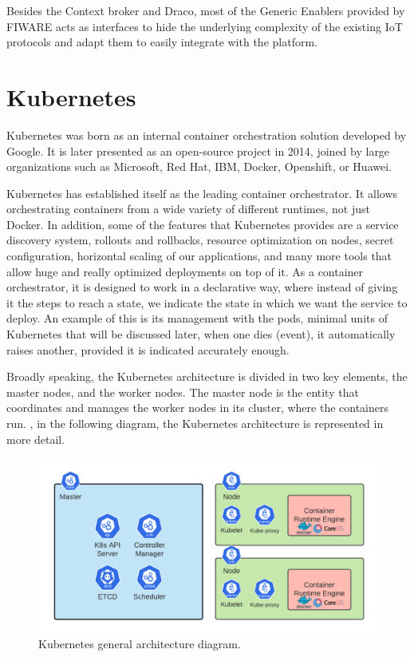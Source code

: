 Besides the Context broker and Draco, most of the Generic Enablers provided by FIWARE acts as interfaces to hide the underlying complexity of the existing IoT protocols and adapt them to easily integrate with the platform.

\clearpage

\section{Kubernetes}
\label{section:Kubernetes}

Kubernetes \cite{kubernetes} was born as an internal container orchestration solution developed by Google. It is later presented as an open-source project in 2014, joined by large organizations such as Microsoft, Red Hat, IBM, Docker, Openshift, or Huawei.

Kubernetes has established itself as the leading container orchestrator. It allows orchestrating containers from a wide variety of different runtimes, not just Docker. In addition, some of the features that Kubernetes provides are a service discovery system, rollouts and rollbacks, resource optimization on nodes, secret configuration, horizontal scaling of our applications, and many more tools that allow huge and really optimized deployments on top of it. As a container orchestrator, it is designed to work in a declarative way, where instead of giving it the steps to reach a state, we indicate the state in which we want the service to deploy. An example of this is its management with the pods, minimal units of Kubernetes that will be discussed later, when one dies (event), it automatically raises another, provided it is indicated accurately enough.

Broadly speaking, the Kubernetes architecture is divided in two key elements, the master nodes, and the worker nodes. The master node is the entity that coordinates and manages the worker nodes in its cluster, where the containers run. , in the following diagram, the Kubernetes architecture is represented in more detail.


\begin{figure}[H]
	\centering
	\includegraphics[width=1\linewidth]{imagenes/kubernetes-components.png}
	\caption{Kubernetes general architecture diagram.}
	\label{kubernetes-components}
\end{figure}

